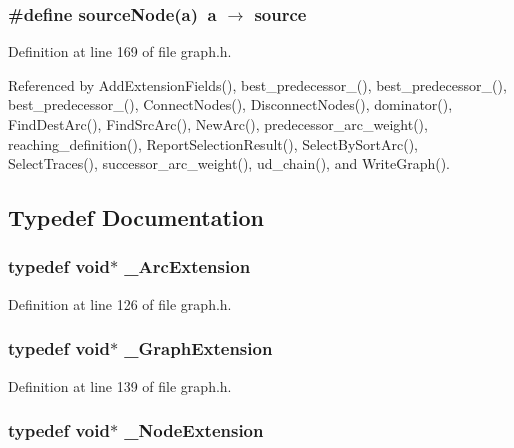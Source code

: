 \subsubsection{\setlength{\rightskip}{0pt plus 5cm}\#define source\-Node(a)~a $\rightarrow$ source}\label{graph_8h_022bcb1545a82f10a89a0c2d94d3ab9d}




Definition at line 169 of file graph.h.

Referenced by Add\-Extension\-Fields(), best\_\-predecessor\_(), best\_\-predecessor\_(), best\_\-predecessor\_(), Connect\-Nodes(), Disconnect\-Nodes(), dominator(), Find\-Dest\-Arc(), Find\-Src\-Arc(), New\-Arc(), predecessor\_\-arc\_\-weight(), reaching\_\-definition(), Report\-Selection\-Result(), Select\-By\-Sort\-Arc(), Select\-Traces(), successor\_\-arc\_\-weight(), ud\_\-chain(), and Write\-Graph().

\subsection{Typedef Documentation}
\subsubsection{\setlength{\rightskip}{0pt plus 5cm}typedef void$\ast$ \bf{\_\-Arc\-Extension}}\label{graph_8h_9c536221c921577d1991f8ffb4c5d605}




Definition at line 126 of file graph.h.
\subsubsection{\setlength{\rightskip}{0pt plus 5cm}typedef void$\ast$ \bf{\_\-Graph\-Extension}}\label{graph_8h_9056b624154916c180d6f85ccbb3b58f}




Definition at line 139 of file graph.h.
\subsubsection{\setlength{\rightskip}{0pt plus 5cm}typedef void$\ast$ \bf{\_\-Node\-Extension}}\label{graph_8h_d4a6deb3c3717127534dcc80157c71e3}




